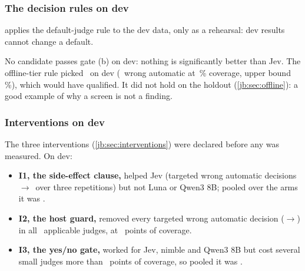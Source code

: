 \subsubsection{The decision rules on dev}

 applies the default-judge rule to the dev data, only as a rehearsal: dev results
cannot change a default.

\begin{table}[tbp]
\centering\small
\caption{Rule 1 on the dev split \screen: each candidate minus Jev. Positive accuracy differences and
negative wrong-automatic differences favour the candidate. Bold Holm $p$ values are $\le 0.05$. Gates:
(a) non-inferior on both endpoints, (b) significantly better on one, (c) p95 $\le$
\RuleOneMaxPninetyfive\,ms, (d) cost $\le$ \RuleOneCostX$\times$ Jev.}
\label{jb:tab:rule1-dev}

\end{table}

No candidate passes gate (b) on dev: nothing is significantly better than Jev. The offline-tier rule
picked \OffBestDev\ on dev (\QwenFourDevOffWaK\ wrong automatic at \QwenFourDevOffCov\,\% coverage, upper
bound \QwenFourDevOffWaUpper\,\%), which would have qualified. It did not hold on the holdout
(\cref{jb:sec:offline}): a good example of why a screen is not a finding.

\subsubsection{Interventions on dev}

The three interventions (\cref{jb:sec:interventions}) were declared before any was measured. On dev:
\begin{itemize}
  \item \textbf{I1, the side-effect clause,} helped Jev (targeted wrong automatic decisions
    \IOneDevJevClBefore$\to$\IOneDevJevClAfter\ over three repetitions) but not Luna or Qwen3 8B; pooled over
    the arms it was \IOneDevConfirmed.
  \item \textbf{I2, the host guard,} removed every targeted wrong automatic decision
    (\ITwoDevBefore$\to$\ITwoDevAfter) in all \ITwoDevNApplicable\ applicable judges, at
    \ITwoDevCovCostRange\ points of coverage.
  \item \textbf{I3, the yes/no gate,} worked for Jev, nimble and Qwen3 8B but cost several small judges
    more than \IConfirmCovPts\ points of coverage, so pooled it was \IThreeDevConfirmed.
\end{itemize}
